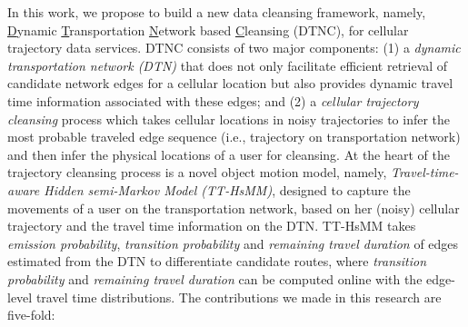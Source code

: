\documentclass{vldb}
\begin{document}
	In this work, we propose to build a new data cleansing framework, namely, \underline{D}ynamic \underline{T}ransportation \underline{N}etwork based \underline{C}leansing (DTNC), for cellular trajectory data services. DTNC consists of two major components: (1) a {\em dynamic transportation network (DTN)} that does not only facilitate efficient retrieval of candidate network edges for a cellular location but also provides dynamic travel time information associated with these edges; and (2) a {\em cellular trajectory cleansing} process which takes cellular locations in noisy trajectories to infer the most probable traveled edge sequence (i.e., trajectory on transportation network) and then infer the physical locations of a user for cleansing. At the heart of the trajectory cleansing process is a novel object motion model, namely, {\em Travel-time-aware Hidden semi-Markov Model (TT-HsMM)}, designed to capture the movements of a user on the transportation network, based on her (noisy) cellular trajectory and the travel time information on the DTN. TT-HsMM takes {\em emission probability}, {\em transition probability} and {\em remaining travel duration} of edges estimated from the DTN to differentiate candidate routes, where {\em transition probability} and {\em remaining travel duration} can be computed online with the edge-level travel time distributions. 
	The contributions we made in this research are five-fold: 
	
\end{document}
